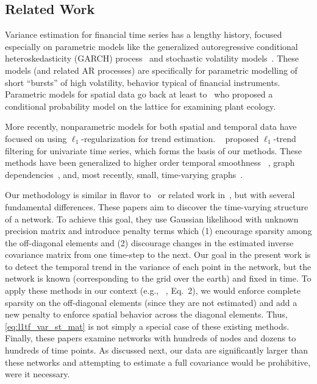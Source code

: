 \documentclass[letterpaper]{article} %
\newcommand{\citet}[1]
{\citeauthor{#1} ~\shortcite{#1}}
\newcommand{\citep}{\cite}
\newcommand{\citealp}[1]
{\citeauthor{#1} ~\citeyear{#1}}
\begin{document}
\subsection{Related Work}

Variance estimation for financial time series has a lengthy history,
focused especially on parametric models like the generalized
autoregressive conditional heteroskedasticity (GARCH) process~\cite{engle2002dynamic} and
stochastic volatility models~\cite{HarveyRuiz1994}. These models (and
related AR processes) are specifically for parametric modelling of
short ``bursts'' of high volatility, behavior typical of financial
instruments. Parametric models for spatial data go back at least
to~\cite{besag1974spatial} who proposed a conditional probability
model on the lattice for examining plant ecology.

More recently, nonparametric models for both spatial and temporal data
have focused on using $\ell_1$-regularization for trend
estimation. \citet{KimKoh2009} proposed $\ell_1$-trend filtering for
univariate time series, which forms the basis of our methods. These
methods have been generalized to higher order temporal smoothness
~\cite{Tibshirani2014}, graph dependencies~\cite{WangSharpnack2016},
and, most recently, small, time-varying
graphs~\cite{HallacPark2017}. 

Our methodology is similar in flavor to~\cite{HallacPark2017} or
related work in~\citep{GibberdNelson2017,MontiHellyer2014}, but with
several fundamental differences. These papers aim to
discover the time-varying structure of a network. To achieve this
goal, they use Gaussian likelihood with unknown precision matrix and
introduce penalty terms which (1) encourage sparsity among the
off-diagonal elements and (2) discourage changes in the estimated inverse
covariance matrix from one time-step to the next.
Our goal in the present work is to detect the temporal trend in the variance of each
point in the network, but the network is known (corresponding to the grid
over the earth) and fixed in time. To apply these methods in our context
(e.g., \citealp{HallacPark2017}, Eq.\ 2), we would
enforce complete sparsity on the off-diagonal elements (since
they are not estimated) and add a new penalty to enforce spatial
behavior across the diagonal elements. Thus, 
\eqref{eq:l1tf_var_st_mat} is not simply a special case of these
existing methods. Finally, these papers examine networks with hundreds
of nodes and dozens to hundreds of time points. As discussed next, our data are
significantly larger than these networks and attempting to estimate a
full covariance would be prohibitive, were it necessary.
\end{document}
